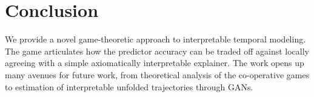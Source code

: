 \vspace{-3mm}
\section{Conclusion}
\label{sec:conclusion}
\vspace{-0.5mm}
We provide a novel game-theoretic approach to interpretable temporal modeling. The game articulates how the predictor accuracy can be traded off against locally agreeing with a simple axiomatically interpretable explainer. The work opens up many avenues for future work, from theoretical analysis of the co-operative games to estimation of interpretable unfolded trajectories through GANs.
